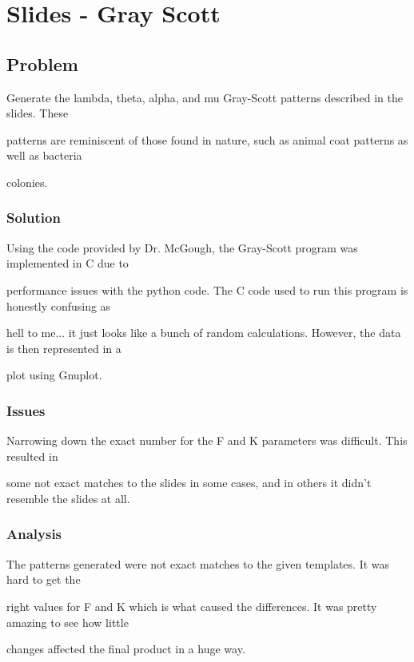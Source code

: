 
\chapter{Slides - Gray Scott}

\section{Problem}

	Generate the lambda, theta, alpha, and mu Gray-Scott patterns described in the slides.  These 

patterns are reminiscent of those found in nature, such as animal coat patterns as well as bacteria 

colonies.

	
\subsection{Solution}

Using the code provided by Dr. McGough, the Gray-Scott program was implemented in C due to 

performance issues with the python code.  The C code used to run this program is honestly confusing as 

hell to me... it just looks like a bunch of random calculations.  However, the data is then represented in a 

plot using Gnuplot.

\subsection{Issues}

Narrowing down the exact number for the F and K parameters was difficult.  This resulted in

some not exact matches to the slides in some cases, and in others it didn't resemble the slides at all.

\subsection{Analysis}

The patterns generated were not exact matches to the given templates.  It was hard to get the 

right values for F and K which is what caused the differences.  It was pretty amazing to see how little 

changes affected the final product in a huge way.

